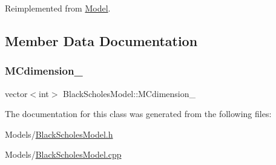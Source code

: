 Reimplemented from \hyperlink{class_model_ab75ee969956d763343ebe2e19f80735c}{Model}.



\subsection{Member Data Documentation}
\hypertarget{class_black_scholes_model_a9457c1edc58d9f737f7eeeaaa6812488}{}\label{class_black_scholes_model_a9457c1edc58d9f737f7eeeaaa6812488} 
\subsubsection{\texorpdfstring{M\+Cdimension\+\_\+}{MCdimension\_}}
{\footnotesize\ttfamily vector$<$int$>$ Black\+Scholes\+Model\+::\+M\+Cdimension\+\_\+\hspace{0.3cm}{\ttfamily [private]}}



The documentation for this class was generated from the following files\+:\begin{DoxyCompactItemize}
\item 
Models/\hyperlink{_black_scholes_model_8h}{Black\+Scholes\+Model.\+h}\item 
Models/\hyperlink{_black_scholes_model_8cpp}{Black\+Scholes\+Model.\+cpp}\end{DoxyCompactItemize}
